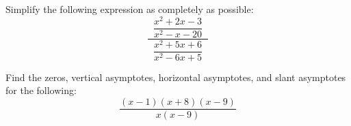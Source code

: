 \documentclass[11pt,letterpaper]{article}
\begin{document}

 Simplify the following expression as completely as possible:
	\[
	\dfrac{\;\;\dfrac{x^2 + 2x - 3}{x^2 - x - 20}\;\;}{\;\;\dfrac{x^2 + 5x + 6}{x^2 - 6x + 5}\;\;}
	\]



\newpage



 Find the zeros, vertical asymptotes, horizontal asymptotes, and slant asymptotes for the following:
	\[
	\dfrac{(x - 1)(x + 8)(x - 9)}{x(x - 9)}
	\]
\end{document}
